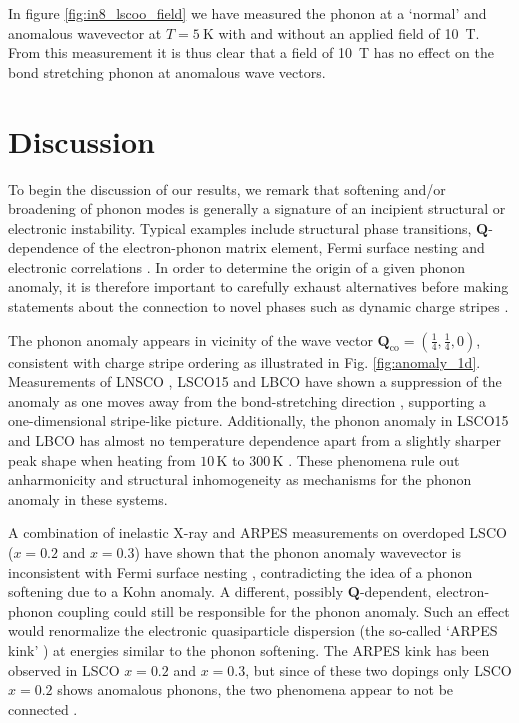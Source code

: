 In figure \ref{fig:in8_lscoo_field} we have measured the phonon at a `normal' and anomalous wavevector at $T=\SI{5}{\kelvin}$ with and without an applied field of \SI{10}{\tesla}. From this measurement it is thus clear that a field of \SI{10}{\tesla} has no effect on the bond stretching phonon at anomalous wave vectors. 

\section{Discussion}
To begin the discussion of our results, we remark that softening and/or broadening of phonon modes is generally a signature of an incipient structural or electronic instability. Typical examples include structural phase transitions, $\bm{Q}$-dependence of the electron-phonon matrix element, Fermi surface nesting and electronic correlations \cite{Reznik2012}. In order to determine the origin of a given phonon anomaly, it is therefore important to carefully exhaust alternatives before making statements about the connection to novel phases such as dynamic charge stripes \cite{Reznik2012}.

The phonon anomaly appears in vicinity of the wave vector $\bm{Q}_\text{co}=(\frac{1}{4},\frac{1}{4},0)$, consistent with charge stripe ordering as illustrated in Fig. \ref{fig:anomaly_1d}. Measurements of LNSCO \cite{Reznik2008b}, LSCO15 \cite{Reznik2007} and LBCO \cite{Reznik2007} have shown a suppression of the anomaly as one moves away from the bond-stretching direction \cite{Reznik2008b}, supporting a one-dimensional stripe-like picture. Additionally, the phonon anomaly in LSCO15 and LBCO has almost no temperature dependence apart from a slightly sharper peak shape when heating from $10\,\text{K}$ to $300\,\text{K}$ \cite{Reznik2006,Reznik2007}. These phenomena rule out anharmonicity and structural inhomogeneity as mechanisms for the phonon anomaly in these systems.

A combination of inelastic X-ray and ARPES measurements on overdoped LSCO ($x=0.2$ and $x=0.3$) have shown that the phonon anomaly wavevector is inconsistent with Fermi surface nesting \cite{Park2013,Park2014}, contradicting the idea of a phonon softening due to a Kohn anomaly. A different, possibly $\bm{Q}$-dependent, electron-phonon coupling could still be responsible for the phonon anomaly. Such an effect would renormalize the electronic quasiparticle dispersion (the so-called `ARPES kink' \cite{Garcia2010}) at energies similar to the phonon softening. The ARPES kink has been observed in LSCO $x=0.2$ and $x=0.3$, but since of these two dopings only LSCO $x=0.2$ shows anomalous phonons, the two phenomena appear to not be connected \cite{Park2014}.

